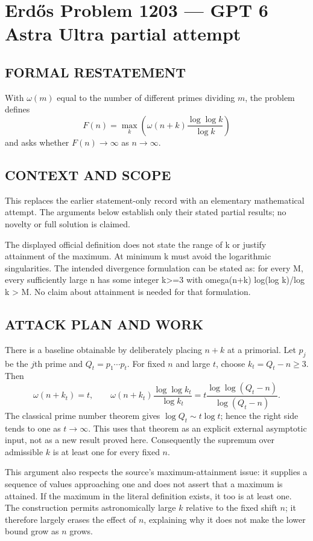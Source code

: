 \section*{Erd\H{o}s Problem 1203 --- GPT 6 Astra Ultra partial attempt}


\subsection*{FORMAL RESTATEMENT}
With $\omega(m)$ equal to the number of different primes dividing $m$, the problem defines
\[F(n)=\max_k\left(\omega(n+k)\frac{\log\log k}{\log k}\right)\]
and asks whether $F(n)\to\infty$ as $n\to\infty$.

\subsection*{CONTEXT AND SCOPE}
This replaces the earlier statement-only record with an elementary mathematical attempt. The arguments below establish only their stated partial results; no novelty or full solution is claimed.

The displayed official definition does not state the range of k or justify attainment of the maximum. At minimum k must avoid the logarithmic singularities. The intended divergence formulation can be stated as: for every M, every sufficiently large n has some integer k>=3 with omega(n+k) log(log k)/log k > M. No claim about attainment is needed for that formulation.

\subsection*{ATTACK PLAN AND WORK}
There is a baseline obtainable by deliberately placing $n+k$ at a primorial.
Let $p_j$ be the $j$th prime and $Q_t=p_1\cdots p_t$. For fixed $n$ and large $t$,
choose $k_t=Q_t-n\ge3$. Then
\[\omega(n+k_t)=t,\qquad
\omega(n+k_t)\frac{\log\log k_t}{\log k_t}
=t\frac{\log\log(Q_t-n)}{\log(Q_t-n)}.\tag{1}\]
The classical prime number theorem gives $\log Q_t\sim t\log t$; hence the
right side tends to one as $t\to\infty$. This uses that theorem as an explicit
external asymptotic input, not as a new result proved here.
Consequently the supremum over admissible $k$ is at least one for every fixed $n$.

This argument also respects the source's maximum-attainment issue: it supplies
a sequence of values approaching one and does not assert that a maximum is
attained. If the maximum in the literal definition exists, it too is at least one.
The construction permits astronomically large $k$ relative to the fixed shift
$n$; it therefore largely erases the effect of $n$, explaining why it does not
make the lower bound grow as $n$ grows.

